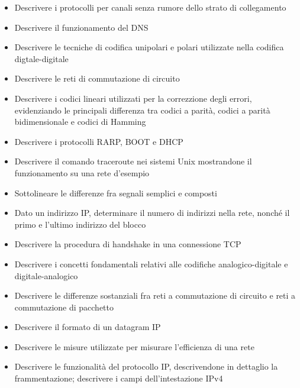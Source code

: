 \begin{itemize}
    \item
    Descrivere i protocolli per canali senza rumore dello strato di collegamento
    
    \item
    Descrivere il funzionamento del DNS
    
    \item
    Descrivere le tecniche di codifica unipolari e polari utilizzate nella codifica digtale-digitale
    
    \item
    Descrivere le reti di commutazione di circuito
    
    \item
    Descrivere i codici lineari utilizzati per la correzzione degli errori, evidenziando le principali differenza tra codici a parità, codici a parità bidimensionale e codici di Hamming
    
    \item
    Descrivere i protocolli RARP, BOOT e DHCP
    
    \item
    Descrivere il comando traceroute nei sistemi Unix mostrandone il funzionamento su una rete d'esempio
    
    \item
    Sottolineare le differenze fra segnali semplici e composti
    
    \item
    Dato un indirizzo IP, determinare il numero di indirizzi nella rete, nonché il primo e l'ultimo indirizzo del blocco
    
    \item
    Descrivere la procedura di handshake in una connessione TCP
    
    \item
    Descrivere i concetti fondamentali relativi alle codifiche analogico-digitale e digitale-analogico
    
    \item
    Descrivere le differenze sostanziali fra reti a commutazione di circuito e reti a commutazione di pacchetto
    
    \item
    Descrivere il formato di un datagram IP
    
    \item
    Descrivere le misure utilizzate per misurare l'efficienza di una rete
    
    \item
    Descrivere le funzionalità del protocollo IP, descrivendone in dettaglio la frammentazione; descrivere i campi dell'intestazione IPv4
    

\end{itemize}
